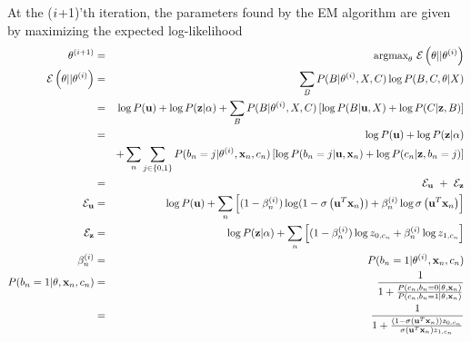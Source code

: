 \documentclass{article}
\begin{document}
At the ($i$+1)'th iteration, the parameters found by the EM algorithm are given by maximizing the expected log-likelihood
\begin{eqnarray*}
  \emparams^{(\emiteration+1)}
  & = &
  \argmax_{\emparams}\ 
  \emobjective\left(\emparams||\emparams^{(\emiteration)}\right)
  \\
  \emobjective\left(\emparams||\emparams^{(\emiteration)}\right)
  & = & 
  \sum_{\missing} P(\missing | \emparams^{(\emiteration)}, \allrealdata, \allcatlabels) \log P(\missing,\allcatlabels,\emparams|\allrealdata)
  \\
  & = & 
  \log P(\weights) + \log P(\labelerrprobs|\pseudocounts)
  + \sum_{\missing} P(\missing | \emparams^{(\emiteration)}, \allrealdata, \allcatlabels) \left[ \log P(\missing| \weights, \allrealdata) + \log P(\allcatlabels|\labelerrprobs,\missing) \right]
  \\
  & = & 
  \log P(\weights) + \log P(\labelerrprobs|\pseudocounts)
  \\ & &
  + \sum_{\datapoint} \sum_{\binlabelindex \in \{0,1\}} P(\binlabel_{\datapoint} = \binlabelindex | \emparams^{(\emiteration)}, \realdata_{\datapoint}, \catlabel_{\datapoint}) \left[ \log P(\binlabel_{\datapoint} = \binlabelindex | \weights, \realdata_{\datapoint}) + \log P(\catlabel_{\datapoint}|\labelerrprobs,\binlabel_{\datapoint}=\binlabelindex) \right]
  \\ & = &
  \emobjective_{\weights}\ +\ \emobjective_{\labelerrprobs}
  \\
  \emobjective_{\weights}
  & = &
  \log P(\weights)
  + \sum_{\datapoint} \left[ (1-\postprob) \log (1 - \logistic{\transpose{\weights} \realdata_{\datapoint}})
  + \postprob \log \logistic{\transpose{\weights} \realdata_{\datapoint}} \right]
  \\
  \emobjective_{\labelerrprobs}
  & = &
  \log P(\labelerrprobs|\pseudocounts)
  + \sum_{\datapoint} \left[ (1-\postprob) \log \labelerrprob_{0,\catlabel_{\datapoint}} + \postprob \log \labelerrprob_{1,\catlabel_{\datapoint}} \right]
  \\
  \postprob
  & = &
  P(\binlabel_{\datapoint} = 1 | \emparams^{(\emiteration)}, \realdata_{\datapoint}, \catlabel_{\datapoint})
  \\
  P(\binlabel_{\datapoint} = 1 | \emparams, \realdata_{\datapoint}, \catlabel_{\datapoint})
  & = &
  \frac{1}{1 + \frac{P(\catlabel_{\datapoint}, \binlabel_{\datapoint} = 0 | \emparams, \realdata_{\datapoint})}
    {P(\catlabel_{\datapoint}, \binlabel_{\datapoint} = 1 | \emparams, \realdata_{\datapoint})}}
  \\
  & = &
  \frac{1}{1 + \frac{(1 - \logistic{\transpose{\weights} \realdata_{\datapoint}}) \labelerrprob_{0,\catlabel_{\datapoint}}}
    {\logistic{\transpose{\weights} \realdata_{\datapoint}} \labelerrprob_{1,\catlabel_{\datapoint}}}}
\end{eqnarray*}
\end{document}
